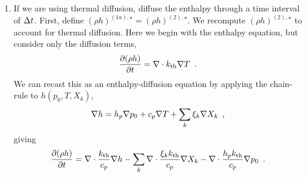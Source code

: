 \begin{description}
\begin{enumerate}
\item If we are using thermal diffusion, diffuse the enthalpy through a time interval of 
$\Delta t$.  First, define $(\rho h)^{(1a),\star} = (\rho h)^{(2),\star}$.  We recompute
$(\rho h)^{(2),\star}$ to account for thermal diffusion.  Here we begin
with the enthalpy equation, but consider only the 
diffusion terms,
\begin{equation}
  \frac{\partial (\rho h)}{\partial t}  = 
 \nabla\cdot k_{\rm th}\nabla T 
\enskip . \label{eq:rhohupdthermal} 
  \end{equation}
We can recast this as an enthalpy-diffusion equation by applying the
chain-rule to $h(p_0,T,X_k)$,
\begin{equation}
\nabla h = h_p \nabla p_0 + c_p \nabla T + \sum_k \xi_k \nabla X_k \enskip ,
\end{equation}
giving
\begin{equation}
  \frac{\partial (\rho h)}{\partial t}  = 
 \nabla\cdot \frac{k_{\rm th}}{c_p}\nabla h -  
 \sum_k \nabla\cdot \frac{\xi_k k_{\rm th}}{c_p}\nabla X_k -
 \nabla\cdot \frac{h_p k_{\rm th}}{c_p}\nabla p_0 
\enskip . \label{eq:rhohupdthermal2} 
  \end{equation}


\end{enumerate}
\end{description}
